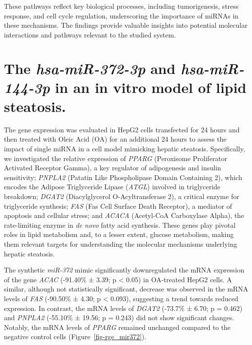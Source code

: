 \documentclass[
  11pt,
  letterpaper,
]{book}
\begin{document}
These pathways reflect key biological processes, including
tumorigenesis, stress response, and cell cycle regulation, underscoring
the importance of miRNAs in these mechanisms. The findings provide
valuable insights into potential molecular interactions and pathways
relevant to the studied system.

\section{\texorpdfstring{The \emph{hsa-miR-372-3p} and
\emph{hsa-miR-144-3p} in an in vitro model of lipid
steatosis.}{The hsa-miR-372-3p and hsa-miR-144-3p in an in vitro model of lipid steatosis.}}\label{the-hsa-mir-372-3p-and-hsa-mir-144-3p-in-an-in-vitro-model-of-lipid-steatosis.}

The gene expression was evaluated in HepG2 cells transfected for 24
hours and then treated with Oleic Acid (OA) for an additional 24 hours
to assess the impact of single miRNA in a cell model mimicking hepatic
steatosis. Specifically, we investigated the relative expression of
\emph{PPARG} (Peroxisome Proliferator Activated Receptor Gamma), a key
regulator of adipogenesis and insulin sensitivity; \emph{PNPLA2}
(Patatin Like Phospholipase Domain Containing 2), which encodes the
Adipose Triglyceride Lipase (\emph{ATGL}) involved in triglyceride
breakdown; \emph{DGAT2} (Diacylglycerol O-Acyltransferase 2), a critical
enzyme for triglyceride synthesis; \emph{FAS} (Fas Cell Surface Death
Receptor), a mediator of apoptosis and cellular stress; and \emph{ACACA}
(Acetyl-CoA Carboxylase Alpha), the rate-limiting enzyme in \emph{de
novo} fatty acid synthesis. These genes play pivotal roles in lipid
metabolism and, to a lesser extent, glucose metabolism, making them
relevant targets for understanding the molecular mechanisms underlying
hepatic steatosis.

The synthetic \emph{miR-372} mimic significantly downregulated the mRNA
expression of the gene \emph{ACAC} (-91.40\% ± 3.39; p \textless{} 0.05)
in OA-treated HepG2 cells. A similar, although not statistically
significant, decrease was observed in the mRNA levels of \emph{FAS}
(-90.50\% ± 4.30; p \textless{} 0.093), suggesting a trend towards
reduced expression. In contrast, the mRNA levels of \emph{DGAT2}
(-73.7\% ± 6.70; p = 0.462) and \emph{PNPLA2} (-55.10\% ± 19.56; p =
0.243) did not show significant changes. Notably, the mRNA levels of
\emph{PPARG} remained unchanged compared to the negative control cells
(Figure~\ref{fig-rge_mir372}).
\end{document}
